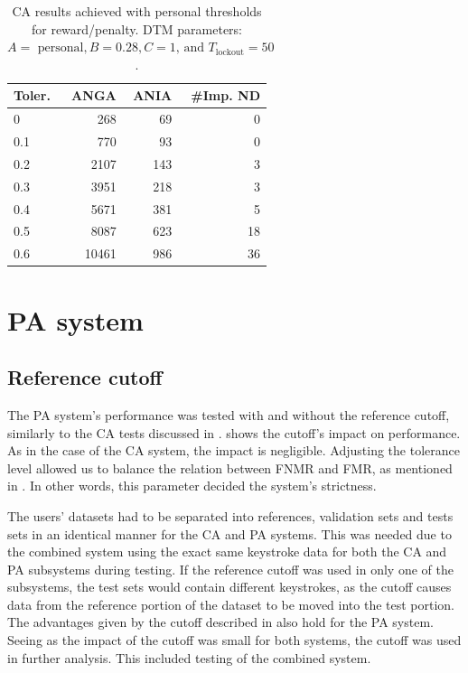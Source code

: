 \begin{table}[h]
\centering
\begin{tabular}{lrrr}
\hline
Toler. & ANGA  & ANIA & \#Imp. ND  \\ \hline
0   & 268   & 69  & 0  \\
0.1 & 770   & 93  & 0  \\
0.2 & 2107  & 143 & 3  \\
0.3 & 3951  & 218 & 3  \\
0.4 & 5671  & 381 & 5  \\
0.5 & 8087  & 623 & 18 \\
0.6 & 10461 & 986 & 36
\end{tabular}
\caption{CA results achieved with personal thresholds for reward/penalty. DTM parameters: \\$A=\text{ personal}, B = 0.28, C=1\text{, and } T_{\text{lockout}} = 50$.}
\label{tab:CA-persRwrdThresh}
\end{table}

\section{PA system}
\label{sec:analysis-PA}
\subsection{Reference cutoff}
The PA system's performance was tested with and without the reference cutoff, similarly to the CA tests discussed in .
 shows the cutoff's impact on performance. 
As in the case of the CA system, the impact is negligible.
Adjusting the tolerance level allowed us to balance the relation between FNMR and FMR, as mentioned in .
In other words, this parameter decided the system's strictness.

The users' datasets had to be separated into references, validation sets and tests sets in an identical manner for the CA and PA systems.
This was needed due to the combined system using the exact same keystroke data for both the CA and PA subsystems during testing.
If the reference cutoff was used in only one of the subsystems, the test sets would contain different keystrokes, as the cutoff causes data from the reference portion of the dataset to be moved into the test portion.
The advantages given by the cutoff described in  also hold for the PA system.
Seeing as the impact of the cutoff was small for both systems, the cutoff was used in further analysis. This included testing of the combined system.

